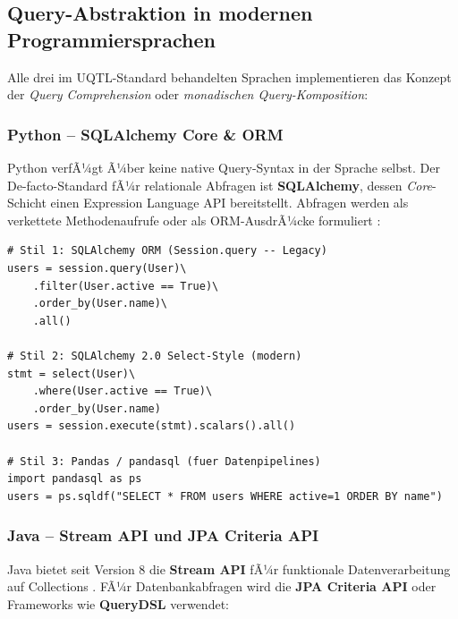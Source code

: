 \subsection{Query-Abstraktion in modernen Programmiersprachen}
\label{subsec:query_abstraktion}

Alle drei im UQTL-Standard behandelten Sprachen implementieren das Konzept der
\emph{Query Comprehension} oder \emph{monadischen Query-Komposition}:

\subsubsection{Python -- SQLAlchemy Core \& ORM}

Python verfÃ¼gt Ã¼ber keine native Query-Syntax in der Sprache selbst.
Der De-facto-Standard fÃ¼r relationale Abfragen ist \textbf{SQLAlchemy},
dessen \emph{Core}-Schicht einen Expression Language API bereitstellt.
Abfragen werden als verkettete Methodenaufrufe oder als ORM-AusdrÃ¼cke
formuliert \cite{sqlalchemy_docs}:

\begin{lstlisting}[style=pythonstyle, caption={Python SQLAlchemy -- Query-Stilarten},
  label=lst:py_styles]
# Stil 1: SQLAlchemy ORM (Session.query -- Legacy)
users = session.query(User)\
    .filter(User.active == True)\
    .order_by(User.name)\
    .all()

# Stil 2: SQLAlchemy 2.0 Select-Style (modern)
stmt = select(User)\
    .where(User.active == True)\
    .order_by(User.name)
users = session.execute(stmt).scalars().all()

# Stil 3: Pandas / pandasql (fuer Datenpipelines)
import pandasql as ps
users = ps.sqldf("SELECT * FROM users WHERE active=1 ORDER BY name")
\end{lstlisting}

\subsubsection{Java -- Stream API und JPA Criteria API}

Java bietet seit Version 8 die \textbf{Stream API} fÃ¼r funktionale
Datenverarbeitung auf Collections \cite{java_stream_docs}. FÃ¼r
Datenbankabfragen wird die \textbf{JPA Criteria API} oder Frameworks
wie \textbf{QueryDSL} verwendet:

